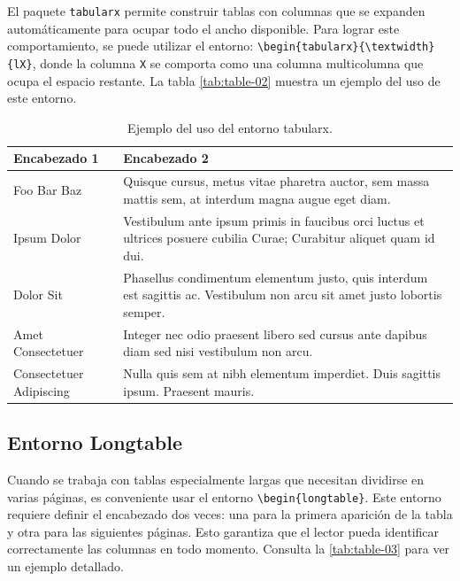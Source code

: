 El paquete \verb|tabularx| permite construir tablas con columnas que se expanden automáticamente para ocupar todo el ancho disponible. Para lograr este comportamiento, se puede utilizar el entorno: \verb|\begin{tabularx}{\textwidth}{lX}|, donde la columna \verb|X| se comporta como una columna multicolumna que ocupa el espacio restante. La tabla \autoref{tab:table-02} muestra un ejemplo del uso de este entorno.

\begin{table}[!htpb]
    \caption{Ejemplo del uso del entorno tabularx.}
    \label{tab:table-02}
    \begin{tabularx}{\textwidth}{lX}
        \toprule
        \textbf{Encabezado 1} & \textbf{Encabezado 2} \\ 
        \midrule
        Foo Bar Baz & Quisque cursus, metus vitae pharetra auctor, sem massa mattis sem, at interdum magna augue eget diam. \\
        Ipsum Dolor & Vestibulum ante ipsum primis in faucibus orci luctus et ultrices posuere cubilia Curae; Curabitur aliquet quam id dui. \\
        Dolor Sit & Phasellus condimentum elementum justo, quis interdum est sagittis ac. Vestibulum non arcu sit amet justo lobortis semper. \\
        Amet Consectetuer & Integer nec odio praesent libero sed cursus ante dapibus diam sed nisi vestibulum non arcu. \\
        Consectetuer Adipiscing & Nulla quis sem at nibh elementum imperdiet. Duis sagittis ipsum. Praesent mauris. \\
        \bottomrule
    \end{tabularx}
\end{table}

\subsection{Entorno Longtable}

Cuando se trabaja con tablas especialmente largas que necesitan dividirse en varias páginas, es conveniente usar el entorno \verb|\begin{longtable}|. Este entorno requiere definir el encabezado dos veces: una para la primera aparición de la tabla y otra para las siguientes páginas. Esto garantiza que el lector pueda identificar correctamente las columnas en todo momento. Consulta la \autoref{tab:table-03} para ver un ejemplo detallado.

